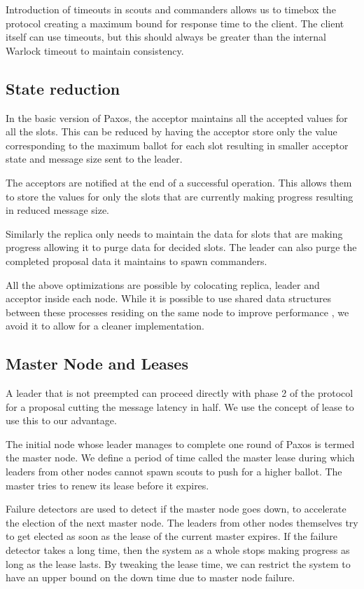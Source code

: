 Introduction of timeouts in scouts and commanders allows us to timebox the
protocol creating a maximum bound for response time to the client. The client
itself can use timeouts, but this should always be greater than the internal
Warlock timeout to maintain consistency.

\subsection{State reduction}

In the basic version of Paxos, the acceptor maintains all the accepted values
for all the slots. This can be reduced by having the acceptor store only the
value corresponding to the maximum ballot for each slot resulting in smaller
acceptor state and  message size sent to the leader.

The acceptors are notified at the end of a successful operation. This allows
them to store the values for only the slots that are currently making
progress resulting in reduced  message size.

Similarly the replica only needs to maintain the data for slots that are
making progress allowing it to purge data for decided slots. The leader can
also purge the completed proposal data it maintains to spawn commanders.

All the above optimizations are possible by colocating replica, leader
and acceptor inside each node. While it is possible to use shared
data structures between these processes residing on the same node to improve
performance , we avoid it to allow for a cleaner implementation.

\subsection{Master Node and Leases}
\label{section:a.n.d.lease}

A leader that is not preempted can proceed directly with phase 2 of the
protocol for a proposal cutting the message latency in half. We use the
concept of lease to use this to our advantage.

The initial node whose leader manages to complete one round of Paxos is
termed the master node. We define a period of time called the master lease
during which leaders from other nodes cannot spawn scouts to push for a
higher ballot. The master tries to renew its lease before it expires.

Failure detectors%
are used to detect if the master node goes down, to accelerate the election
of the next master node. The leaders from other nodes themselves try to
get elected as soon as the lease of the current master expires. If the
failure detector takes a long time, then the system as a whole
stops making progress as long as the lease lasts. By tweaking the lease
time, we can restrict the system to have an upper bound on the down time
due to master node failure.

